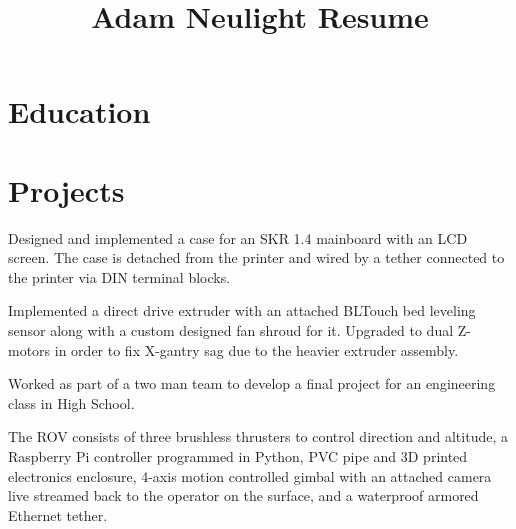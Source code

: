 \documentclass[letter]{comcv}
\title{Adam Neulight Resume}
\begin{document}

\section{Education}
    \begin{tightlist}
    \end{tightlist}
    \smallskip





\section{Projects}


    \begin{tightlist}
        \item Designed and implemented a case for an SKR 1.4 mainboard with an LCD screen. The case is detached from the printer and wired by a tether connected to the printer via DIN terminal blocks.
        \item Implemented a direct drive extruder with an attached BLTouch bed leveling sensor along with a custom designed fan shroud for it. Upgraded to dual Z-motors in order to fix X-gantry sag due to the heavier extruder assembly.
    \end{tightlist}

    \begin{tightlist}
        \item Worked as part of a two man team to develop a final project for an engineering class in High School.
        \item The ROV consists of three brushless thrusters to control direction and altitude, a Raspberry Pi controller programmed in Python, PVC pipe and 3D printed electronics enclosure, 4-axis motion controlled gimbal with an attached camera live streamed back to the operator on the surface, and a waterproof armored Ethernet tether.
    \end{tightlist}
\end{document}
